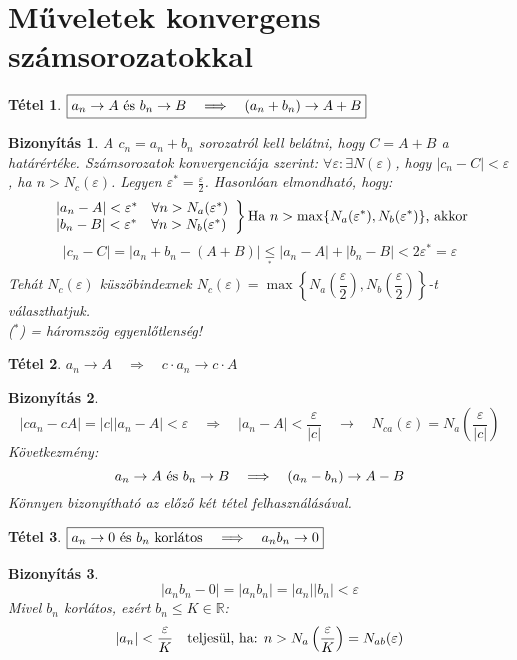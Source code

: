 \documentclass[a4paper,12pt,twoside]{book}
\newtheorem{tetel}{Tétel}[chapter]
\theoremstyle{break}
\newtheorem{biz}{Bizonyítás}[chapter]
\newtheorem{bizNL}[biz]{Bizonyítás}
\theoremstyle{plain}
\begin{document}
\section{Műveletek konvergens számsorozatokkal}

\begin{tetel}\label{OsszegHatarertek} $\boxed{a_n \to A$ és $b_n \to B \quad \Longrightarrow \quad (a_n+b_n) \to A+B}$\end{tetel}
\begin{bizNL}
  A $c_n = a_n + b_n$ sorozatról kell belátni, hogy $C=A+B$ a határértéke. Számsorozatok konvergenciája szerint: $\forall\varepsilon:\exists N(\varepsilon)$, hogy $|c_n-C| < \varepsilon$, ha $n>N_c(\varepsilon)$. Legyen $\varepsilon^* = \frac{\varepsilon}{2}$. Hasonlóan elmondható, hogy:
  \[
    \left.\begin{array}{l}
      |a_n-A|<\varepsilon^* \quad \forall n>N_a(\varepsilon^*) \\
      |b_n-B|<\varepsilon^* \quad \forall n>N_b(\varepsilon^*)
    \end{array}\right\} \hbox{Ha } n>\max\{N_a(\varepsilon^*),N_b(\varepsilon^*)\} \hbox{, akkor }
  \]
  \[|c_n-C| = |a_n+b_n-(A+B)| \underset{^*}{\leqslant} |a_n-A|+|b_n-B| < 2\varepsilon^* = \varepsilon\]
  Tehát $N_c(\varepsilon)$ küszöbindexnek $N_c(\varepsilon)=\max\left\{N_a\left(\dfrac{\varepsilon}{2}\right),N_b\left(\dfrac{\varepsilon}{2}\right)\right\}$-t választhatjuk.\\
  ($^*$) = háromszög egyenlőtlenség!
\end{bizNL}

\begin{tetel}\label{KonstansSzorSorozat} $\boxed{a_n \to A \quad \Longrightarrow \quad c\cdot a_n \to c\cdot A}$\end{tetel}
\begin{biz}
\[|c a_n - cA| = |c||a_n-A| < \varepsilon \quad \Longrightarrow \quad |a_n-A| < \frac{\varepsilon}{|c|} \quad \rightarrow \quad N_{ca}(\varepsilon) = N_a\left(\frac{\varepsilon}{|c|}\right)\]
Következmény:
\[a_n \to A \hbox{ és } b_n \to B \quad \Longrightarrow \quad (a_n-b_n) \to A-B\]
Könnyen bizonyítható az előző két tétel felhasználásával.
\end{biz}

\begin{tetel}\label{0szorozvaKorlatos} $\boxed{a_n \to 0 $ és $b_n$ korlátos $\quad \Longrightarrow \quad a_nb_n \to 0}$\end{tetel}
\begin{biz}
\[|a_nb_n - 0| = |a_nb_n| = |a_n||b_n| < \varepsilon\]
Mivel $b_n$ korlátos, ezért $b_n\leqslant K \in\mathbb{R}$:
\[|a_n| < \frac{\varepsilon}{K} \quad \hbox{teljesül, ha: } n>N_a\left(\frac{\varepsilon}{K}\right)=N_{ab}(\varepsilon)\]
\end{biz}
\end{document}
